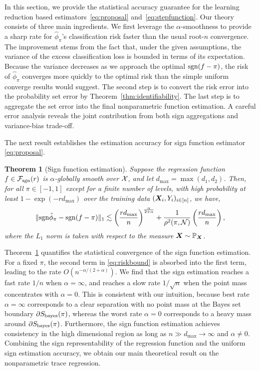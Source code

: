 \documentclass[aos]{imsart}
\newtheorem{theorem}{Theorem}%
\theoremstyle{definition}
\def\sign{\textup{sgn}}
\def\bayesS{S_{\textup{bayes}}}
\def\caliF{\tF_{\textup{sgn}}}
\begin{document}
In this section, we provide the statistical accuracy guarantee for the learning reduction based estimators~\eqref{eq:proposal} and~\eqref{eq:stepfunction}. Our theory consists of three main ingredients. We first leverage the $\alpha$-smoothness to provide a sharp rate for $\hat \phi_\pi$'s classification risk faster than the usual root-$n$ convergence. The improvement stems from the fact that, under the given assumptions, the variance of the excess classification loss is bounded in terms of its expectation. Because the variance decreases as we approach the optimal $\sign(f-\pi)$, the risk of $\hat \phi_\pi$ converges more quickly to the optimal risk than the simple uniform converge results would suggest.  The second step is to convert the risk error into the probability set error by Theorem~\ref{thm:identifiability}. The last step is to aggregate the set error into the final nonparametric function estimation. A careful error analysis reveals the joint contribution from both sign aggregations and variance-bias trade-off. 

The next result establishes the estimation accuracy for sign function estimator \eqref{eq:proposal}. 

\begin{theorem}[Sign function estimation]\label{thm:main} Suppose the regression function $f\in\caliF(r)$ is $\alpha$-globally smooth over $\mathcal{X}$, and let $d_{\max}=\max(d_1,d_2)$. Then, for all $\pi\in[-1,1]$ except for a finite number of levels, with high probability at least $1-\exp(-rd_{\max})$ over the training data $(\bm X_i,Y_i)_{i\in[n]}$, we have, 
\begin{equation}\label{eq:riskbound}
\onenormSize{}{\sign \hat \phi_\pi- \sign(f-\pi)} \lesssim \left({rd_{\max} \over n}\right)^{\alpha\over 2+\alpha}+{1\over \rho^2(\pi, \tN)}\left({rd_{\max}\over n}\right),
\end{equation}
where the $L_1$ norm is taken with respect to the measure $\bm X\sim\mathbb{P}_{\bm X}$. 
\end{theorem}

\noindent
Theorem~\ref{thm:main} quantifies the statistical convergence of the sign function estimation. For a fixed $\pi$, the second term in \eqref{eq:riskbound} is absorbed into the first term, leading to the rate $O(n^{-\alpha/(2+\alpha)})$. We find that the sign estimation reaches a fast rate $1/n$ when $\alpha =\infty$, and reaches a slow rate $1/\sqrt{n}$ when the point mass concentrates with $\alpha=0$. This is consistent with our intuition, because best rate $\alpha = \infty$ corresponds to a clear separation with no point mass at the Bayes set boundary $\partial \bayesS(\pi)$, whereas the worst rate $\alpha = 0$ corresponds to a heavy mass around $\partial \bayesS(\pi)$. Furthermore, the sign function estimation achieves consistency in the high dimensional region as long as $n \gg d_{\max}\to \infty$ and $\alpha\neq 0$. Combining the sign representability of the regression function and the uniform sign estimation accuracy, we obtain our main theoretical result on the nonparametric trace regression. 
\end{document}
